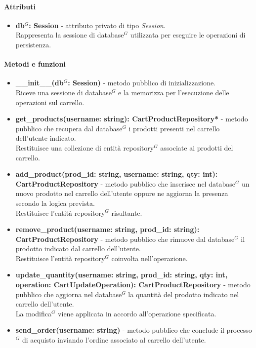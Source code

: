 \paragraph{Attributi}
\begin{itemize}
	\item \textbf{db$^G$: Session} - attributo privato di tipo \textit{Session}.\\
	Rappresenta la sessione di database$^G$ utilizzata per eseguire le operazioni di persistenza.
\end{itemize}

\paragraph{Metodi e funzioni}
\begin{itemize}
	\item \textbf{\_\_init\_\_(db$^G$: Session)} - metodo pubblico di inizializzazione.\\
	Riceve una sessione di database$^G$ e la memorizza per l'esecuzione delle operazioni sul carrello.
	\item \textbf{get\_products(username: string): CartProductRepository*} - metodo pubblico che recupera dal database$^G$ i prodotti presenti nel carrello dell'utente indicato.\\
	Restituisce una collezione di entit\`a repository$^G$ associate ai prodotti del carrello.
	\item \textbf{add\_product(prod\_id: string, username: string, qty: int): CartProductRepository} - metodo pubblico che inserisce nel database$^G$ un nuovo prodotto nel carrello dell'utente oppure ne aggiorna la presenza secondo la logica prevista.\\
	Restituisce l'entit\`a repository$^G$ risultante.
	\item \textbf{remove\_product(username: string, prod\_id: string): CartProductRepository} - metodo pubblico che rimuove dal database$^G$ il prodotto indicato dal carrello dell'utente.\\
	Restituisce l'entit\`a repository$^G$ coinvolta nell'operazione.
	\item \textbf{update\_quantity(username: string, prod\_id: string, qty: int, operation: CartUpdateOperation): CartProductRepository} - metodo pubblico che aggiorna nel database$^G$ la quantit\`a del prodotto indicato nel carrello dell'utente.\\
	La modifica$^G$ viene applicata in accordo all'operazione specificata.
	\item \textbf{send\_order(username: string)} - metodo pubblico che conclude il processo$^G$ di acquisto inviando l'ordine associato al carrello dell'utente.
\end{itemize}


